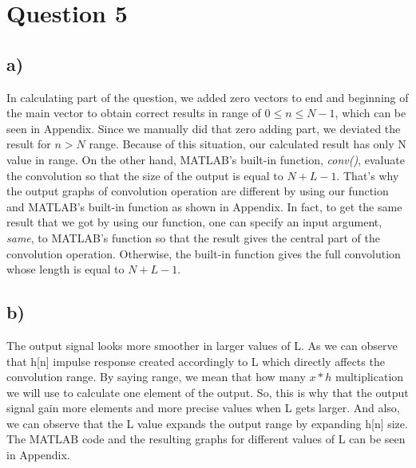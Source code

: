 \documentclass[12pt]{article}
\begin{document}
    \section*{Question 5}
    \subsection*{a)}
In calculating part of the question, we added zero vectors to end and beginning of the main vector to obtain correct results in range of \(0\leq n \leq N-1\), which can be seen in Appendix. Since we manually did that zero adding part, we deviated the result for \(n>N\) range. Because of this situation, our calculated result has only N value in range. On the other hand, MATLAB’s built-in function, \emph{conv()}, evaluate the convolution so that the size of the output is equal to \(N+L-1\). That's why the output graphs of convolution operation are different by using our function and MATLAB's built-in function as shown in Appendix. In fact, to get the same result that we got by using our function, one can specify an input argument, \emph{same}, to MATLAB's function so that the result gives the central part of the convolution operation. Otherwise, the built-in function gives the full convolution whose length is equal to \(N+L-1\).
\subsection*{b)}
The output signal looks more smoother in larger values of L. As we can observe that h[n] impulse response created accordingly to L which directly affects the convolution range. By saying range, we mean that how many \(x*h\) multiplication we will use to calculate one element of the output. So, this is why that the output signal gain more elements and more precise values when L gets larger. And also, we can observe that the L value expands the output range by expanding h[n] size. The MATLAB code and the resulting graphs for different values of L can be seen in Appendix. 

    
\end{document}
